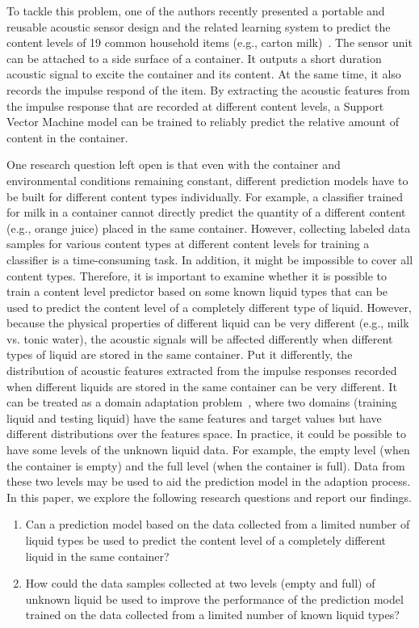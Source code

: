 \documentclass{article} %
\begin{document}
To tackle this problem, one of the authors recently presented a portable and reusable acoustic sensor design and the related learning system to predict the content levels of 19 common household items (e.g., carton milk)~\cite{fan2015soqr}. The sensor unit can be attached to a side surface of a container. It outputs a short duration acoustic signal to excite the container and its content. At the same time, it also records the impulse respond of the item. By extracting the acoustic features from the impulse response that are recorded at different content levels, a Support Vector Machine model can be trained to reliably predict the relative amount of content in the container.

One research question left open is that even with the container and environmental conditions remaining constant, different prediction models have to be built for different content types individually. For example, a classifier trained for milk in a container cannot directly predict the quantity of a different content (e.g., orange juice) placed in the same container. However, collecting labeled data samples for various content types at different content levels for training a classifier is a time-consuming task. In addition, it might be impossible to cover all content types. Therefore, it is important to examine whether it is possible to train a content level predictor based on some known liquid types that can be used to predict the content level of a completely different type of liquid. However, because the physical properties of different liquid can be very different (e.g., milk vs. tonic water), the acoustic signals will be affected differently when different types of liquid are stored in the same container. Put it differently, the distribution of acoustic features extracted from the impulse responses recorded when different liquids are stored in the same container can be very different. It can be treated as a domain adaptation problem~\cite{pan2010survey}, where two domains (training liquid and testing liquid) have the same features and target values but have different distributions over the features space. In practice, it could be possible to have some levels of the unknown liquid data. For example, the empty level (when the container is empty) and the full level (when the container is full). Data from these two levels may be used to aid the prediction model in the adaption process. In this paper, we explore the following research questions and report our findings.

\begin{enumerate}
\item Can a prediction model based on the data collected from a limited number of liquid types be used to predict the content level of a completely different liquid in the same container?
\item How could the data samples collected at two levels (empty and full) of unknown liquid be used to improve the performance of the prediction model trained on the data collected from a limited number of known liquid types?  
\end{enumerate}
\end{document}
